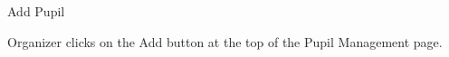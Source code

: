 
\begin{uc}{Add Pupil}


    \begin{uc-trig}
        Organizer clicks on the Add button at the top of the Pupil Management
        page.
    \end{uc-trig}

\end{uc}


